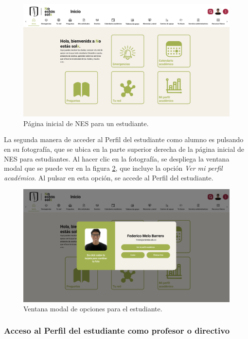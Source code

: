 \begin{figure}[H]
	\centering
	\includegraphics[width=\textwidth]{assets/nes/landing_estudiante.png}
	\caption{Página inicial de NES para un estudiante.}
	\label{fig:landing_estudiante}
\end{figure}

La segunda manera de acceder al Perfil del estudiante como alumno es pulsando en su fotografía, que se ubica en la parte superior derecha de la página inicial de \gls{NES} para estudiantes. Al hacer clic en la fotografía, se despliega la ventana modal que se puede ver en la figura \ref{fig:menu_estudiante}, que incluye la opción \textit{Ver mi perfil académico}. Al pulsar en esta opción, se accede al Perfil del estudiante.

\begin{figure}[H]
	\centering
	\includegraphics[width=\textwidth]{assets/nes/menu_estudiante.png}
	\caption{Ventana modal de opciones para el estudiante.}
	\label{fig:menu_estudiante}
\end{figure}

\subsubsection{Acceso al Perfil del estudiante como profesor o directivo}

